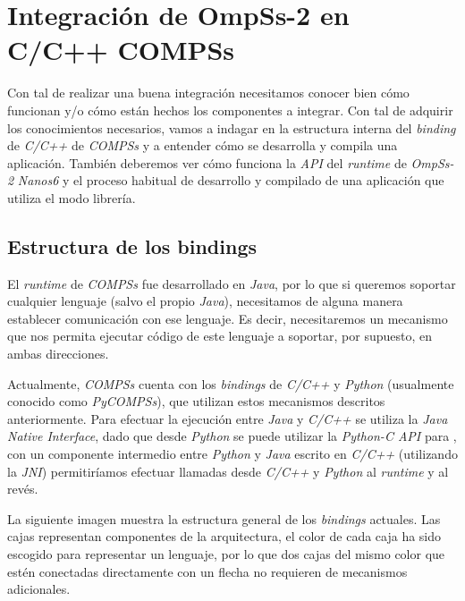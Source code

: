 

\chapter{Integración de OmpSs-2 en C/C++ COMPSs}

Con tal de realizar una buena integración necesitamos conocer bien cómo funcionan y/o cómo están hechos los componentes a integrar. Con tal de adquirir los conocimientos necesarios, vamos a indagar en la estructura interna del \textit{binding} de \textit{C/C++} de \textit{COMPSs} y a entender cómo se desarrolla y compila una aplicación. También deberemos ver cómo funciona la \textit{API} del \textit{runtime} de \textit{OmpSs-2} \textit{Nanos6} y el proceso habitual de desarrollo y compilado de una aplicación que utiliza el modo librería.

\section{Estructura de los bindings}

El \textit{runtime} de \textit{COMPSs} fue desarrollado en \textit{Java}, por lo que si queremos soportar cualquier lenguaje (salvo el propio \textit{Java}), necesitamos de alguna manera establecer comunicación con ese lenguaje. Es decir, necesitaremos un mecanismo que nos permita ejecutar código de este lenguaje a soportar, por supuesto, en ambas direcciones. 
\par\bigskip
Actualmente, \textit{COMPSs} cuenta con los \textit{bindings} de \textit{C/C++} y \textit{Python} (usualmente conocido como \textit{PyCOMPSs}), que utilizan estos mecanismos descritos anteriormente. Para efectuar la ejecución entre \textit{Java} y \textit{C/C++} se utiliza la \textit{Java Native Interface}, dado que desde \textit{Python} se puede utilizar la \textit{Python-C API} para , con un componente intermedio entre \textit{Python} y \textit{Java} escrito en \textit{C/C++} (utilizando la \textit{JNI}) permitiríamos efectuar llamadas desde \textit{C/C++} y \textit{Python} al \textit{runtime} y al revés. 
\par\bigskip
La siguiente imagen muestra la estructura general de los \textit{bindings} actuales. Las cajas representan componentes de la arquitectura, el color de cada caja ha sido escogido para representar un lenguaje, por lo que dos cajas del mismo color que estén conectadas directamente con un flecha no requieren de mecanismos adicionales.

